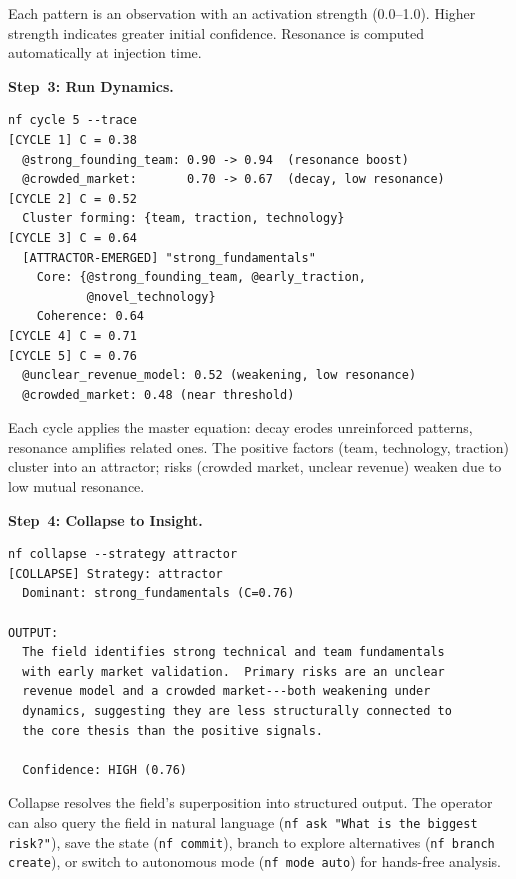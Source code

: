 \noindent
Each pattern is an observation with an activation strength
(0.0--1.0).  Higher strength indicates greater initial confidence.
Resonance is computed automatically at injection time.

\bigskip\noindent\textbf{Step~3: Run Dynamics.}
\nopagebreak[4]\smallskip

\begin{terminalbox}
\begin{lstlisting}[style=neosshell]
nf cycle 5 --trace
[CYCLE 1] C = 0.38
  @strong_founding_team: 0.90 -> 0.94  (resonance boost)
  @crowded_market:       0.70 -> 0.67  (decay, low resonance)
[CYCLE 2] C = 0.52
  Cluster forming: {team, traction, technology}
[CYCLE 3] C = 0.64
  [ATTRACTOR-EMERGED] "strong_fundamentals"
    Core: {@strong_founding_team, @early_traction,
           @novel_technology}
    Coherence: 0.64
[CYCLE 4] C = 0.71
[CYCLE 5] C = 0.76
  @unclear_revenue_model: 0.52 (weakening, low resonance)
  @crowded_market: 0.48 (near threshold)
\end{lstlisting}
\end{terminalbox}

\noindent
Each cycle applies the master equation: decay erodes unreinforced
patterns, resonance amplifies related ones.  The positive factors
(team, technology, traction) cluster into an attractor; risks
(crowded market, unclear revenue) weaken due to low mutual resonance.

\clearpage
\noindent\textbf{Step~4: Collapse to Insight.}
\nopagebreak[4]\smallskip

\begin{terminalbox}
\begin{lstlisting}[style=neosshell]
nf collapse --strategy attractor
[COLLAPSE] Strategy: attractor
  Dominant: strong_fundamentals (C=0.76)

OUTPUT:
  The field identifies strong technical and team fundamentals
  with early market validation.  Primary risks are an unclear
  revenue model and a crowded market---both weakening under
  dynamics, suggesting they are less structurally connected to
  the core thesis than the positive signals.

  Confidence: HIGH (0.76)
\end{lstlisting}
\end{terminalbox}

\noindent
Collapse resolves the field's superposition into structured output.
The operator can also query the field in natural language
(\texttt{nf ask "What is the biggest risk?"}), save the state
(\texttt{nf commit}), branch to explore alternatives
(\texttt{nf branch create}), or switch to autonomous mode
(\texttt{nf mode auto}) for hands-free analysis.


